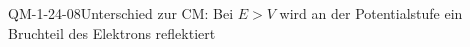 
\begin{CONC}{QM-1-24-08}{Unterschied zur CM: Bei $E>V$ wird an der Potentialstufe ein Bruchteil des Elektrons reflektiert}
\end{CONC}
